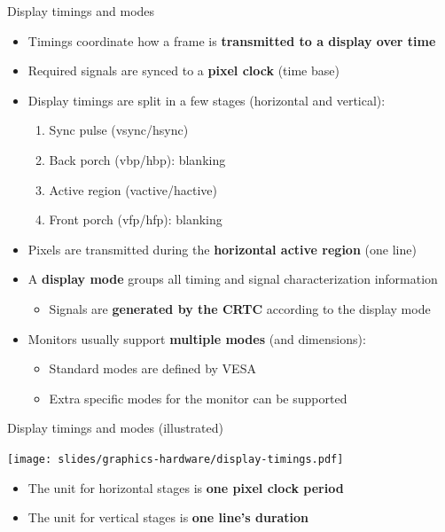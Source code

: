 \begin{frame}{Display timings and modes}
  \begin{itemize}
  \item Timings coordinate how a frame is \textbf{transmitted to a display over time}
  \item Required signals are synced to a \textbf{pixel clock} (time base)
  \item Display timings are split in a few stages (horizontal and vertical):
    \begin{enumerate}
    \item Sync pulse (vsync/hsync)
    \item Back porch (vbp/hbp): blanking
    \item Active region (vactive/hactive)
    \item Front porch (vfp/hfp): blanking 
    \end{enumerate}
  \item Pixels are transmitted during the \textbf{horizontal active region} (one line)
  \item A \textbf{display mode} groups all timing and signal characterization information
    \begin{itemize}
    \item Signals are \textbf{generated by the CRTC} according to the display mode
    \end{itemize}
  \item Monitors usually support \textbf{multiple modes} (and dimensions):
    \begin{itemize}
    \item Standard modes are defined by VESA
    \item Extra specific modes for the monitor can be supported
    \end{itemize}
  \end{itemize}
\end{frame}

\begin{frame}{Display timings and modes (illustrated)}
  \begin{center}
  \texttt{[image: slides/graphics-hardware/display-timings.pdf]}
  \end{center}

  \begin{itemize}
  \item The unit for horizontal stages is \textbf{one pixel clock period}
  \item The unit for vertical stages is \textbf{one line's duration}
  \end{itemize}
\end{frame}


